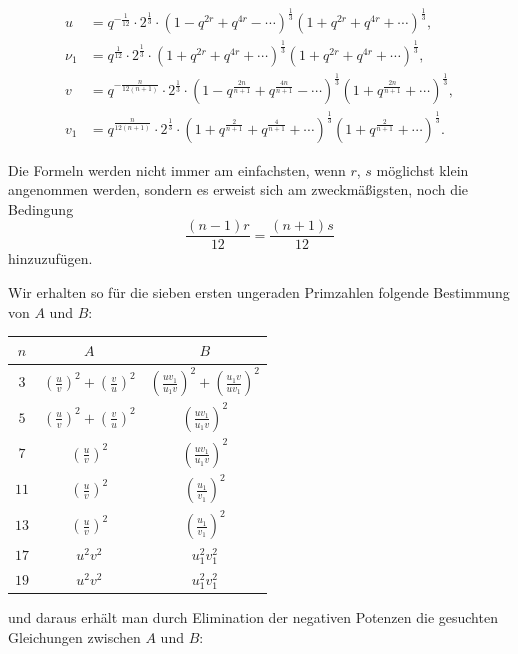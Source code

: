 \documentclass[12pt,a4paper]{article}
\theoremstyle{definition}
\begin{document}
\begin{equation}\label{eq:73-14}
\begin{aligned}
u &= q^{-\frac{1}{12}} \cdot 2^{\frac{1}{3}} \cdot (1 - q^{2r} + q^{4r} - \cdots)^{\frac{1}{3}} (1 + q^{2r} + q^{4r} + \cdots)^{\frac{1}{3}}, \\
\nu_1 &= q^{\frac{1}{12}} \cdot 2^{\frac{1}{3}} \cdot (1 + q^{2r} + q^{4r} + \cdots)^{\frac{1}{3}} (1 + q^{2r} + q^{4r} + \cdots)^{\frac{1}{3}}, \\
v &= q^{-\frac{n}{12(n+1)}} \cdot 2^{\frac{1}{3}} \cdot (1 - q^{\frac{2n}{n+1}} + q^{\frac{4n}{n+1}} - \cdots)^{\frac{1}{3}} (1 + q^{\frac{2n}{n+1}} + \cdots)^{\frac{1}{3}}, \\
v_1 &= q^{\frac{n}{12(n+1)}} \cdot 2^{\frac{1}{3}} \cdot (1 + q^{\frac{2}{n+1}} + q^{\frac{4}{n+1}} + \cdots)^{\frac{1}{3}} (1 + q^{\frac{2}{n+1}} + \cdots)^{\frac{1}{3}}.
\end{aligned}
\end{equation}

Die Formeln werden nicht immer am einfachsten, wenn $r$, $s$ möglichst klein angenommen werden, sondern es erweist sich am zweckmäßigsten, noch die Bedingung
\[
\frac{(n-1)r}{12} = \frac{(n+1)s}{12}
\]
hinzuzufügen.

Wir erhalten so für die sieben ersten ungeraden Primzahlen folgende Bestimmung von $A$ und $B$:

\begin{center}
\begin{tabular}{c|cc}
$n$ & $A$ & $B$ \\
\midrule
$3$ & $\left(\frac{u}{v}\right)^2 + \left(\frac{v}{u}\right)^2$ & $\left(\frac{uv_1}{u_1v}\right)^2 + \left(\frac{u_1v}{uv_1}\right)^2$ \\
$5$ & $\left(\frac{u}{v}\right)^2 + \left(\frac{v}{u}\right)^2$ & $\left(\frac{uv_1}{u_1v}\right)^2$ \\
$7$ & $\left(\frac{u}{v}\right)^2$ & $\left(\frac{uv_1}{u_1v}\right)^2$ \\
$11$ & $\left(\frac{u}{v}\right)^2$ & $\left(\frac{u_1}{v_1}\right)^2$ \\
$13$ & $\left(\frac{u}{v}\right)^2$ & $\left(\frac{u_1}{v_1}\right)^2$ \\
$17$ & $u^2 v^2$ & $u_1^2 v_1^2$ \\
$19$ & $u^2 v^2$ & $u_1^2 v_1^2$ \\
\end{tabular}
\end{center}

und daraus erhält man durch Elimination der negativen Potenzen die gesuchten Gleichungen zwischen $A$ und $B$:
\end{document}
